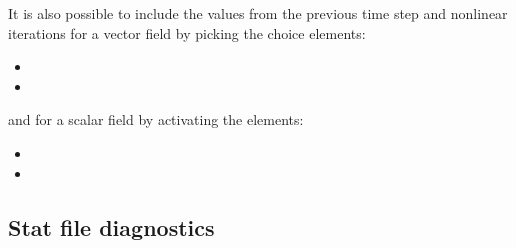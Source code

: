 It is also possible to include the values from the previous time step and nonlinear iterations for a vector field by picking the choice elements:
\begin{itemize}
\item {}
\item {}
\end{itemize}

and for a scalar field by activating the elements:

\begin{itemize}
\item {}
\item {}
\end{itemize}

\subsection{Stat file diagnostics}
\label{sect:stat_diagnostics}

